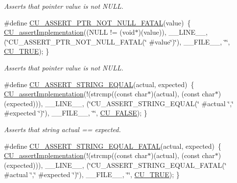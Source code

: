 \begin{DoxyCompactItemize}
\begin{DoxyCompactList}\small\item\em Asserts that pointer value is not N\-U\-L\-L. \end{DoxyCompactList}\item 
\#define \hyperlink{group__Framework_ga9edb99bd9b5b546fee56626db3ebfc6e}{C\-U\-\_\-\-A\-S\-S\-E\-R\-T\-\_\-\-P\-T\-R\-\_\-\-N\-O\-T\-\_\-\-N\-U\-L\-L\-\_\-\-F\-A\-T\-A\-L}(value)~\{ \hyperlink{group__Framework_ga31a858e8b496b2af992b63902064c5fa}{C\-U\-\_\-assert\-Implementation}((N\-U\-L\-L != (void$\ast$)(value)), \-\_\-\-\_\-\-L\-I\-N\-E\-\_\-\-\_\-, (\char`\"{}C\-U\-\_\-\-A\-S\-S\-E\-R\-T\-\_\-\-P\-T\-R\-\_\-\-N\-O\-T\-\_\-\-N\-U\-L\-L\-\_\-\-F\-A\-T\-A\-L(\char`\"{} \#value\char`\"{})\char`\"{}), \-\_\-\-\_\-\-F\-I\-L\-E\-\_\-\-\_\-, \char`\"{}\char`\"{}, \hyperlink{group__Framework_ga99641394bc766ca9c4a295e942fed1ef}{C\-U\-\_\-\-T\-R\-U\-E}); \}
\begin{DoxyCompactList}\small\item\em Asserts that pointer value is not N\-U\-L\-L. \end{DoxyCompactList}\item 
\#define \hyperlink{group__Framework_gaf70ea1c422a5bda04a31db754dbabb56}{C\-U\-\_\-\-A\-S\-S\-E\-R\-T\-\_\-\-S\-T\-R\-I\-N\-G\-\_\-\-E\-Q\-U\-A\-L}(actual, expected)~\{ \hyperlink{group__Framework_ga31a858e8b496b2af992b63902064c5fa}{C\-U\-\_\-assert\-Implementation}(!(strcmp((const char$\ast$)(actual), (const char$\ast$)(expected))), \-\_\-\-\_\-\-L\-I\-N\-E\-\_\-\-\_\-, (\char`\"{}C\-U\-\_\-\-A\-S\-S\-E\-R\-T\-\_\-\-S\-T\-R\-I\-N\-G\-\_\-\-E\-Q\-U\-A\-L(\char`\"{} \#actual \char`\"{},\char`\"{}  \#expected \char`\"{})\char`\"{}), \-\_\-\-\_\-\-F\-I\-L\-E\-\_\-\-\_\-, \char`\"{}\char`\"{}, \hyperlink{group__Framework_ga7453214541b156ef868681eaafe60860}{C\-U\-\_\-\-F\-A\-L\-S\-E}); \}
\begin{DoxyCompactList}\small\item\em Asserts that string actual == expected. \end{DoxyCompactList}\item 
\#define \hyperlink{group__Framework_ga1d7267b09f629605d8c7fe9ab57ef960}{C\-U\-\_\-\-A\-S\-S\-E\-R\-T\-\_\-\-S\-T\-R\-I\-N\-G\-\_\-\-E\-Q\-U\-A\-L\-\_\-\-F\-A\-T\-A\-L}(actual, expected)~\{ \hyperlink{group__Framework_ga31a858e8b496b2af992b63902064c5fa}{C\-U\-\_\-assert\-Implementation}(!(strcmp((const char$\ast$)(actual), (const char$\ast$)(expected))), \-\_\-\-\_\-\-L\-I\-N\-E\-\_\-\-\_\-, (\char`\"{}C\-U\-\_\-\-A\-S\-S\-E\-R\-T\-\_\-\-S\-T\-R\-I\-N\-G\-\_\-\-E\-Q\-U\-A\-L\-\_\-\-F\-A\-T\-A\-L(\char`\"{} \#actual \char`\"{},\char`\"{}  \#expected \char`\"{})\char`\"{}), \-\_\-\-\_\-\-F\-I\-L\-E\-\_\-\-\_\-, \char`\"{}\char`\"{}, \hyperlink{group__Framework_ga99641394bc766ca9c4a295e942fed1ef}{C\-U\-\_\-\-T\-R\-U\-E}); \}

\end{DoxyCompactItemize}
